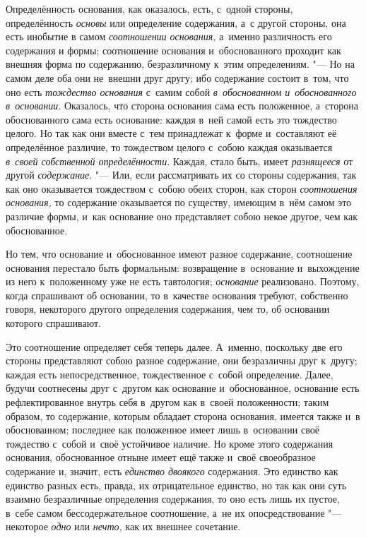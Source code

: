 
Определённость основания, как оказалось, есть, с~одной стороны, определённость
{\em основы} или определение содержания, а~с другой стороны, она есть инобытие
в самом {\em соотношении основания,} а~именно различность его содержания и
формы; соотношение основания и~обоснованного проходит как внешняя форма по
содержанию, безразличному к~этим определениям. "--- Но на самом
деле оба они не~внешни друг другу; ибо содержание состоит
в~том, что оно есть {\em тождество основания} с~самим собой
{\em в~обоснованном и~обоснованного в~основании}. Оказалось, что сторона
основания сама есть положенное, а~сторона обоснованного сама есть основание:
каждая в~ней самой есть это тождество целого. Но так как они вместе с~тем
принадлежат к~форме и~составляют её определённое различие, то тождеством целого
с~собою каждая оказывается {\em в~своей собственной
определённости}. Каждая, стало быть,
имеет {\em разнящееся} от другой {\em содержание}. "--- Или, если рассматривать
их со стороны содержания, так как оно оказывается тождеством с~собою обеих
сторон, как сторон {\em соотношения основания,} то содержание оказывается по
существу, имеющим в~нём самом это различие формы, и~как основание оно
представляет собою некое другое, чем как обоснованное.

Но тем, что основание и~обоснованное имеют разное содержание, соотношение
основания перестало быть формальным: возвращение в~основание и~выхождение из
него к~положенному уже не есть тавтология; {\em основание} реализовано.
Поэтому, когда спрашивают об основании, то в~качестве основания требуют,
собственно говоря, некоторого другого определения содержания, чем то, об
основании которого спрашивают.

Это соотношение определяет себя теперь далее. А~именно, поскольку две его
стороны представляют собою разное содержание, они безразличны друг к~другу;
каждая есть непосредственное, тождественное с~собой определение. Далее, будучи
соотнесены друг с~другом как основание и~обоснованное, основание есть
рефлектированное внутрь себя в~другом как в~своей положенности; таким образом,
то содержание, которым обладает сторона основания, имеется также и~в
обоснованном; последнее как положенное имеет лишь в~основании своё тождество
с~собой и~своё устойчивое наличие. Но кроме этого содержания основания,
обоснованное отныне имеет ещё также и~своё своеобразное содержание и, значит,
есть {\em единство двоякого} содержания. Это единство как единство разных есть,
правда, их отрицательное единство, но так как они суть взаимно безразличные
определения содержания, то оно есть лишь их пустое, в~себе самом
бессодержательное соотношение, а~не их опосредствование "--- некоторое
{\em одно} или {\em нечто,} как их внешнее сочетание.

